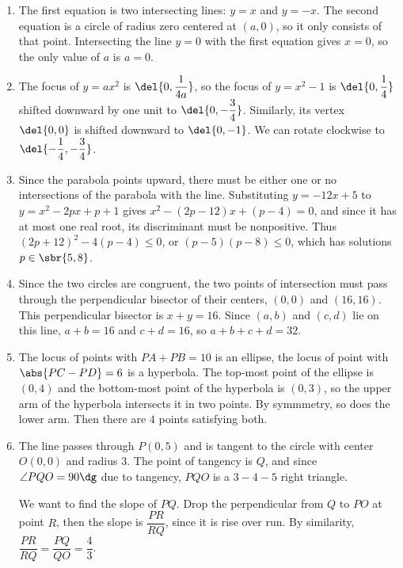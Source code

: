 \documentclass[10pt,paper=letter]{scrartcl}
\begin{document}
\begin{enumerate}

\item The first equation is two intersecting lines: $y = x$ and $y = -x$. The second equation is a circle of radius zero centered at $(a, 0)$, so it only consists of that point. Intersecting the line $y = 0$ with the first equation gives $x = 0$, so the only value of $a$ is $a = 0$.

\item The focus of $y = ax^2$ is $\del{0, \dfrac1{4a}}$, so the focus of $y = x^2 - 1$ is $\del{0, \dfrac14}$ shifted downward by one unit to $\del{0, -\dfrac34}$. Similarly, its vertex $\del{0, 0}$ is shifted downward to $\del{0, -1}$. We can rotate clockwise to $\del{-\dfrac14, -\dfrac34}$.

\item Since the parabola points upward, there must be either one or no intersections of the parabola with the line. Substituting $y = -12x + 5$ to $y = x^2 - 2px + p + 1$ gives $x^2 - (2p - 12)x + (p - 4) = 0$, and since it has at most one real root, its discriminant must be nonpositive. Thus $(2p + 12)^2 - 4(p - 4) \leq 0$, or $(p - 5)(p - 8) \leq 0$, which has solutions $p \in \sbr{5, 8}$.

\item Since the two circles are congruent, the two points of intersection must pass through the perpendicular bisector of their centers, $(0, 0)$ and $(16, 16)$. This perpendicular bisector is $x + y = 16$. Since $(a, b)$ and $(c, d)$ lie on this line, $a + b = 16$ and $c + d = 16$, so $a + b + c + d = 32$. 

\item The locus of points with $PA + PB = 10$ is an ellipse, the locus of point with $\abs{PC - PD} = 6$ is a hyperbola. The top-most point of the ellipse is $(0, 4)$ and the bottom-most point of the hyperbola is $(0, 3)$, so the upper arm of the hyperbola intersects it in two points. By symmmetry, so does the lower arm. Then there are $4$ points satisfying both.

\item The line passes through $P(0, 5)$ and is tangent to the circle with center $O(0, 0)$ and radius $3$. The point of tangency is $Q$, and since $\angle PQO = 90\dg$ due to tangency, $PQO$ is a $3-4-5$ right triangle.

We want to find the slope of $PQ$. Drop the perpendicular from $Q$ to $PO$ at point $R$, then the slope is $\dfrac{PR}{RQ}$, since it is rise over run. By similarity, $\dfrac{PR}{RQ} = \dfrac{PQ}{QO} = \dfrac43$.


\end{enumerate}
\end{document}
